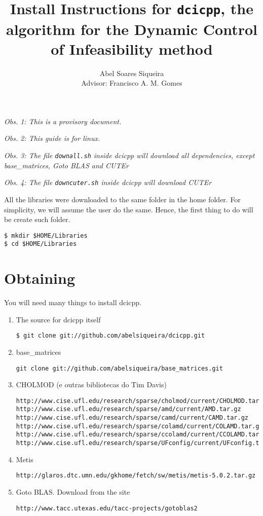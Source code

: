 \documentclass[letterpaper,11pt]{article}
\title{Install Instructions for {\tt dcicpp}, the algorithm for the Dynamic Control of Infeasibility method}
\author{Abel Soares Siqueira \\ Advisor: Francisco A. M. Gomes}
\numberwithin{equation}{section}
\newcommand{\makesec}[1]{\section[#1]{#1}}
\begin{document}
 \maketitle

{\it Obs. 1: This is a provisory document.}

{\it Obs. 2: This guide is for linux.}

{\it Obs. 3: The file {\tt downall.sh} inside dcicpp will download all dependencies, except base\_matrices, Goto BLAS and CUTEr}

{\it Obs. 4: The file {\tt downcuter.sh} inside dcicpp will download CUTEr}

All the libraries were downloaded to the same folder in the home folder. For simplicity, we will assume the user do the same. Hence, the first thing to do will be create such folder.

\begin{verbatim}
$ mkdir $HOME/Libraries
$ cd $HOME/Libraries
\end{verbatim}

\makesec{Obtaining}

You will need many things to install dcicpp.
\begin{enumerate}
 \item The source for dcicpp itself
\begin{verbatim}
$ git clone git://github.com/abelsiqueira/dcicpp.git
\end{verbatim}
 \item base\_matrices
\begin{verbatim}
git clone git://github.com/abelsiqueira/base_matrices.git
\end{verbatim}
 \item CHOLMOD (e outras bibliotecas do Tim Davis)
\begin{verbatim}
http://www.cise.ufl.edu/research/sparse/cholmod/current/CHOLMOD.tar.gz
http://www.cise.ufl.edu/research/sparse/amd/current/AMD.tar.gz
http://www.cise.ufl.edu/research/sparse/camd/current/CAMD.tar.gz
http://www.cise.ufl.edu/research/sparse/colamd/current/COLAMD.tar.gz
http://www.cise.ufl.edu/research/sparse/ccolamd/current/CCOLAMD.tar.gz
http://www.cise.ufl.edu/research/sparse/UFconfig/current/UFconfig.tar.gz
\end{verbatim}
 \item Metis
\begin{verbatim}
http://glaros.dtc.umn.edu/gkhome/fetch/sw/metis/metis-5.0.2.tar.gz
\end{verbatim}
 \item Goto BLAS. Download from the site
\begin{verbatim}
http://www.tacc.utexas.edu/tacc-projects/gotoblas2
\end{verbatim}
\end{enumerate}
\end{document}
